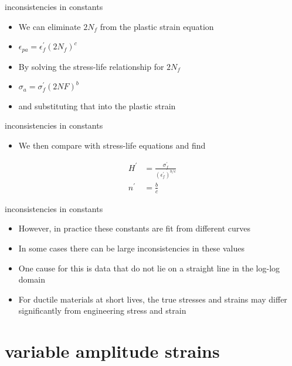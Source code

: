 \documentclass[
  letterpaper,
  ignorenonframetext,
  aspectratio=43,
  handout,
  12pt]{beamer}
\providecommand{\tightlist}{%
  \setlength{\itemsep}{0pt}\setlength{\parskip}{0pt}}
\providecommand{\tightlist}{%
\setlength{\itemsep}{0pt}\setlength{\parskip}{0pt}}
\begin{document}
\begin{frame}{inconsistencies in constants}
\protect\hypertarget{inconsistencies-in-constants-1}{}
\begin{itemize}
\tightlist
\item
  We can eliminate \(2N_f\) from the plastic strain equation
\item
  \(\epsilon_{pa} = \epsilon_f^\prime(2N_f)^c\)
\item
  By solving the stress-life relationship for \(2N_f\)
\item
  \(\sigma_a = \sigma_f^\prime (2NF)^b\)
\item
  and substituting that into the plastic strain
\end{itemize}
\end{frame}

\begin{frame}{inconsistencies in constants}
\protect\hypertarget{inconsistencies-in-constants-2}{}
\begin{itemize}
\tightlist
\item
  We then compare with stress-life equations and find
\end{itemize}

\[\begin{aligned}
 H^\prime &= \frac{\sigma_f^\prime}{(\epsilon_f^\prime)^{b/c}}\\
 n^\prime &= \frac{b}{c}
\end{aligned}\]
\end{frame}

\begin{frame}{inconsistencies in constants}
\protect\hypertarget{inconsistencies-in-constants-3}{}
\begin{itemize}
\tightlist
\item
  However, in practice these constants are fit from different curves
\item
  In some cases there can be large inconsistencies in these values
\item
  One cause for this is data that do not lie on a straight line in the
  log-log domain
\item
  For ductile materials at short lives, the true stresses and strains
  may differ significantly from engineering stress and strain
\end{itemize}
\end{frame}

\hypertarget{variable-amplitude-strains}{%
\section{variable amplitude strains}\label{variable-amplitude-strains}}
\end{document}
